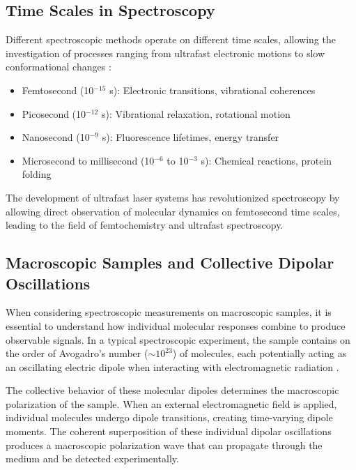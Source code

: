 \subsection{Time Scales in Spectroscopy}
\label{subsec:time_scales}

\noindent Different spectroscopic methods operate on different time scales, allowing the investigation of processes ranging from ultrafast electronic motions to slow conformational changes \cite{bogaczetal2025xrayabsorptionspectroscopy, fullerogilvie2015experimentalimplementationstwodimensional}:

\begin{itemize}
	\item Femtosecond (10$^{-15}$ s): Electronic transitions, vibrational coherences
	\item Picosecond (10$^{-12}$ s): Vibrational relaxation, rotational motion
	\item Nanosecond (10$^{-9}$ s): Fluorescence lifetimes, energy transfer
	\item Microsecond to millisecond (10$^{-6}$ to 10$^{-3}$ s): Chemical reactions, protein folding
\end{itemize}

\noindent The development of ultrafast laser systems has revolutionized spectroscopy by allowing direct observation of molecular dynamics on femtosecond time scales, leading to the field of femtochemistry and ultrafast spectroscopy.

\subsection{Macroscopic Samples and Collective Dipolar Oscillations}
\label{subsec:macroscopic_samples}

\noindent When considering spectroscopic measurements on macroscopic samples, it is essential to understand how individual molecular responses combine to produce observable signals. In a typical spectroscopic experiment, the sample contains on the order of Avogadro's number ($\sim 10^{23}$) of molecules, each potentially acting as an oscillating electric dipole when interacting with electromagnetic radiation \cite{feynman1965feynmanlecturesphysics}.

\noindent The collective behavior of these molecular dipoles determines the macroscopic polarization of the sample. When an external electromagnetic field is applied, individual molecules undergo dipole transitions, creating time-varying dipole moments. The coherent superposition of these individual dipolar oscillations produces a macroscopic polarization wave that can propagate through the medium and be detected experimentally.

